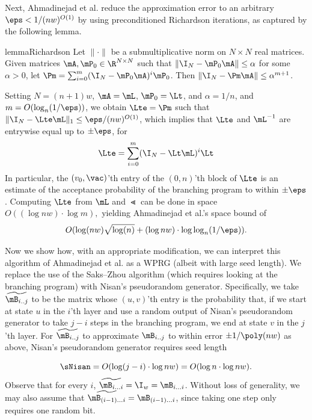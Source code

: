 \documentclass{toc}
\begin{document}
   Next, %
Ahmadinejad  %
et al. reduce the approximation error to an arbitrary $\eps<1/(nw)^{O(1)}$ by using preconditioned Richardson iterations, as captured by the following lemma. %
   
   
    \begin{restatable}{lemma}{Richardson}
    \label{lem:richardson}
    Let $\|\cdot\|$ be a submultiplicative norm on $N\times N$ real matrices. Given matrices $\mA,\mP_0\in \R^{N\times N}$ such that $\|\I_N-\mP_0\mA\|\leq \alpha$ for some $\alpha >0$, let $\Pm=\sum_{i=0}^m(\I_N-\mP_0\mA)^i\mP_0$. Then $\|\I_N-\Pm \mA\|\leq \alpha^{m+1}$.
    \end{restatable}
    
    Setting $N=(n+1)w$, $\mA=\mL$, $\mP_0=\Lt$, and $\alpha=1/n$, and
    $m=O(\log_{n}(1/\eps))$, we obtain $\Lte=\Pm$ such that
    $\|\I_N-\Lte \mL\|_1\leq \eps/(nw)^{O(1)}$, which implies that $\Lte$ and $\mL^{-1}$ are entrywise equal up to $\pm \eps$, for
    \begin{equation}
        \Lte = \sum_{i=0}^m(\I_N-\Lt\mL)^i\Lt \label{eqn:iterated_L}
    \end{equation}
    In particular, the $(v_0,\vac)$'th entry of the $(0,n)$'th block of $\Lte$ is an estimate of the acceptance probability of the branching program to within $\pm \eps$.  Computing $\Lte$ from $\mL$ and $\Lt$ 
    can be done in space $O((\log nw)\cdot \log m),$ yielding 
%
Ahmadinejad  %
et al.'s space bound of 
    $$O(\log(nw)\sqrt{\log(n)} + (\log nw)\cdot \log \log_{n}(1/\eps)).$$
    
Now we show how, with an appropriate modification, we can interpret this algorithm of
%
Ahmadinejad  %
et al. as a WPRG (albeit with large seed length).
    We replace the use of the Saks--Zhou algorithm (which requires looking at the branching program) with Nisan's pseudorandom generator.  Specifically, we take 
    $\widetilde{\mB_{i .. j}}$ to be the matrix whose $(u,v)$'th entry
    is the probability that, if we start at state $u$ in %
    the $i$'th layer and
    use a random output of Nisan's pseudorandom generator to take $j-i$ steps in the branching program, we end at state $v$ in the $j$'th layer.  For 
    $\widetilde{\mB_{i .. j}}$ to approximate $\mB_{i .. j}$ to within error $\pm 1/\poly(nw)$ as above, Nisan's pseudorandom generator requires seed length 
    
    $$\sNisan = O(\log(j-i)\cdot \log nw) = O(\log n\cdot \log nw).$$
    Observe that for every $i$, $\widetilde{\mB_{i\ldots i}} = \I_w = \mB_{i\ldots i}$. Without loss of generality, we may also assume that
    $\widetilde{\mB_{(i-1)\ldots i}}=\mB_{(i-1)\ldots i}$, since taking one step only requires one random bit.  
    
\end{document}
